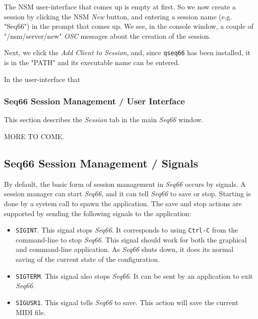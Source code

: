    The NSM user-interface that comes up is empty at first.  So we now create a
   session by clicking the NSM \textsl{New} button, and entering a session name
   (e.g. "Seq66") in the prompt that comes up.  We see, in the console window,
   a couple of
   "/nsm/server/new" \textsl{OSC} messages about the creation of the session.

   Next, we click the \textsl{Add Client to Session}, and, since
   \texttt{qseq66} has been installed, it is in the "PATH" and its executable
   name can be entered.





   In the user-interface that

\subsubsection{Seq66 Session Management / User Interface}
\label{subsubsec:sessions_ui}

   This section describes the \textsl{Session} tab in the main
   \textsl{Seq66} window.

   MORE TO COME.

\subsection{Seq66 Session Management / Signals}
\label{subsec:sessions_signals}

   By default, the basic form of session management in
   \textsl{Seq66} occurs by signals.  A
   session manager can start \textsl{Seq66}, and it can tell \textsl{Seq66} to
   save or stop.  Starting is done by a system call to spawn the application.
   The save and stop actions are supported by sending the following signals to
   the application:

   \begin{itemize}
      \item \texttt{SIGINT}.  This signal stops \textsl{Seq66}. It corresponds
         to using \texttt{Ctrl-C} from the command-line to stop \textsl{Seq66}.
         This signal should work for both the graphical and command-line
         application.  As \textsl{Seq66} shuts down, it does its normal saving
         of the current state of the configuration.
      \item \texttt{SIGTERM}.  This signal also stops \textsl{Seq66}.  It can
         be sent by an application to exit \textsl{Seq66}.
      \item \texttt{SIGUSR1}.  This signal tells \textsl{Seq66} to save.  This
         action will save the current MIDI file.
   \end{itemize}

